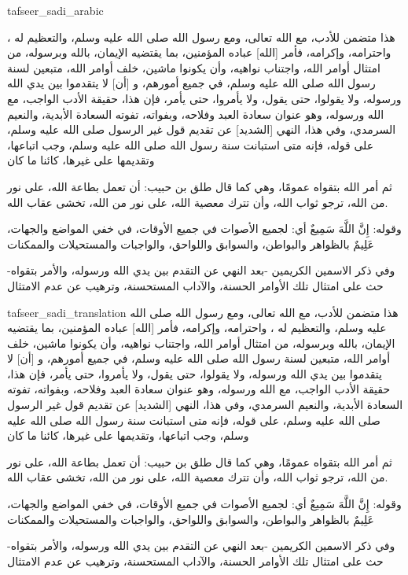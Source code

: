 \begin{taggedblock}{tafseer_sadi_arabic}
\begin{Arabic}
هذا متضمن للأدب، مع الله تعالى، ومع رسول الله صلى الله عليه وسلم، والتعظيم له ، واحترامه، وإكرامه، فأمر
[الله]
عباده المؤمنين، بما يقتضيه الإيمان، بالله وبرسوله، من امتثال أوامر الله، واجتناب نواهيه، وأن يكونوا ماشين، خلف أوامر الله، متبعين لسنة رسول الله صلى الله عليه وسلم، في جميع أمورهم، و
[أن]
لا يتقدموا بين يدي الله ورسوله، ولا يقولوا، حتى يقول، ولا يأمروا، حتى يأمر، فإن هذا، حقيقة الأدب الواجب، مع الله ورسوله، وهو عنوان سعادة العبد وفلاحه، وبفواته، تفوته السعادة الأبدية، والنعيم السرمدي، وفي هذا، النهي
[الشديد]
عن تقديم قول غير الرسول صلى الله عليه وسلم، على قوله، فإنه متى استبانت سنة رسول الله صلى الله عليه وسلم، وجب اتباعها، وتقديمها على غيرها، كائنا ما كان

ثم أمر الله بتقواه عمومًا، وهي كما قال طلق بن حبيب: أن تعمل بطاعة الله، على نور من الله، ترجو ثواب الله، وأن تترك معصية الله، على نور من الله، تخشى عقاب الله.

وقوله:
{ إِنَّ اللَّهَ سَمِيعٌ }
أي: لجميع الأصوات في جميع الأوقات، في خفي المواضع والجهات،
{ عَلِيمٌ }
بالظواهر والبواطن، والسوابق واللواحق، والواجبات والمستحيلات والممكنات

وفي ذكر الاسمين الكريمين -بعد النهي عن التقدم بين يدي الله ورسوله، والأمر بتقواه- حث على امتثال تلك الأوامر الحسنة، والآداب المستحسنة، وترهيب عن عدم الامتثال
\end{Arabic}
\end{taggedblock}
\begin{taggedblock}{tafseer_sadi_translation}
هذا متضمن للأدب، مع الله تعالى، ومع رسول الله صلى الله عليه وسلم، والتعظيم له ، واحترامه، وإكرامه، فأمر
[الله]
عباده المؤمنين، بما يقتضيه الإيمان، بالله وبرسوله، من امتثال أوامر الله، واجتناب نواهيه، وأن يكونوا ماشين، خلف أوامر الله، متبعين لسنة رسول الله صلى الله عليه وسلم، في جميع أمورهم، و
[أن]
لا يتقدموا بين يدي الله ورسوله، ولا يقولوا، حتى يقول، ولا يأمروا، حتى يأمر، فإن هذا، حقيقة الأدب الواجب، مع الله ورسوله، وهو عنوان سعادة العبد وفلاحه، وبفواته، تفوته السعادة الأبدية، والنعيم السرمدي، وفي هذا، النهي
[الشديد]
عن تقديم قول غير الرسول صلى الله عليه وسلم، على قوله، فإنه متى استبانت سنة رسول الله صلى الله عليه وسلم، وجب اتباعها، وتقديمها على غيرها، كائنا ما كان

ثم أمر الله بتقواه عمومًا، وهي كما قال طلق بن حبيب: أن تعمل بطاعة الله، على نور من الله، ترجو ثواب الله، وأن تترك معصية الله، على نور من الله، تخشى عقاب الله.

وقوله:
{ إِنَّ اللَّهَ سَمِيعٌ }
أي: لجميع الأصوات في جميع الأوقات، في خفي المواضع والجهات،
{ عَلِيمٌ }
بالظواهر والبواطن، والسوابق واللواحق، والواجبات والمستحيلات والممكنات

وفي ذكر الاسمين الكريمين -بعد النهي عن التقدم بين يدي الله ورسوله، والأمر بتقواه- حث على امتثال تلك الأوامر الحسنة، والآداب المستحسنة، وترهيب عن عدم الامتثال
\end{taggedblock}
